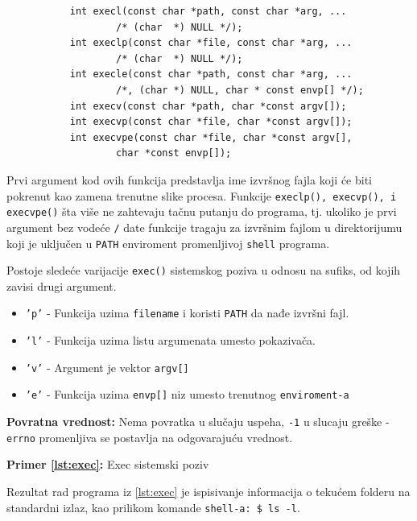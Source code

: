 \documentclass[a4paper, 11pt, twoside]{article}
\newcommand{\scode}[3] {
	\hspace{.06\textwidth} 
	\begin{minipage}[t]{.88\textwidth} %
		\begin{mdframed}[topline=true,bottomline=true,leftline=true,rightline=true,backgroundcolor=gray!22, linecolor=gray!60!black,roundcorner=1mm]
			 

	\begin{center}
		\caption{\textbf{Primer \ref{lst:#3}:} #2}
	\end{center}
	\end{mdframed}
	\end{minipage}

}
\begin{document}
\hspace{.15\textwidth} 
\begin{minipage}[t]{.7\textwidth} %
	\begin{verbatim}
	       int execl(const char *path, const char *arg, ...
			       /* (char  *) NULL */);
	       int execlp(const char *file, const char *arg, ...
			       /* (char  *) NULL */);
	       int execle(const char *path, const char *arg, ...
			       /*, (char *) NULL, char * const envp[] */);
	       int execv(const char *path, char *const argv[]);
	       int execvp(const char *file, char *const argv[]);
	       int execvpe(const char *file, char *const argv[],
			       char *const envp[]);
       \end{verbatim}
\end{minipage}

Prvi argument kod ovih funkcija predstavlja ime izvršnog fajla koji će biti pokrenut kao zamena trenutne slike procesa. Funkcije \texttt{execlp(), execvp(), i execvpe()} šta više ne zahtevaju tačnu putanju do programa, tj. ukoliko je prvi argument bez vodeće \texttt{/} date funkcije tragaju za izvršnim fajlom u direktorijumu koji je uključen u \texttt{PATH} enviroment promenljivoj \texttt{shell} programa.
	
Postoje sledeće varijacije \texttt{exec()} sistemskog poziva u odnosu na sufiks, od kojih zavisi drugi argument.

\begin{itemize}[]
	\item{\texttt{'p'} - Funkcija uzima \texttt{filename} i koristi \texttt{PATH} da nađe izvršni fajl.}
	\item{\texttt{'l'} - Funkcija uzima listu argumenata umesto pokazivača.}
	\item{\texttt{'v'} - Argument je vektor \texttt{argv[]}}
	\item{\texttt{'e'} - Funkcija uzima \texttt{envp[]} niz umesto trenutnog \texttt{enviroment-a}}
\end{itemize}

\textbf{Povratna vrednost:} Nema povratka u slučaju uspeha, \texttt{-1} u slucaju greške - \texttt{errno} promenljiva se postavlja na odgovarajuću vrednost.

\vspace{-1mm} 
\scode{exec.c}{Exec sistemski poziv}{exec}

\vspace{2mm} 
Rezultat rad programa iz \ref{lst:exec} je ispisivanje informacija o tekućem folderu na standardni izlaz, kao prilikom komande \texttt{shell-a: \$ ls -l}.
\end{document}
